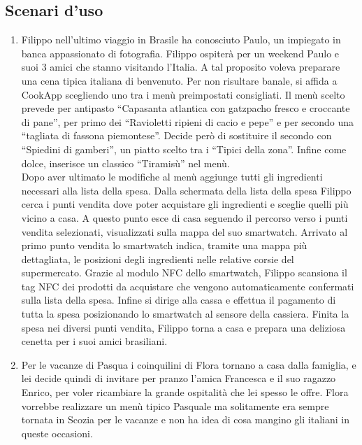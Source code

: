 \subsection{Scenari d'uso}
\begin{enumerate}

\item Filippo nell'ultimo viaggio in Brasile ha conosciuto Paulo, un
impiegato in banca appassionato di fotografia. Filippo ospiterà per un
weekend Paulo
e suoi 3 amici che stanno visitando l'Italia. A tal proposito voleva
preparare una cena tipica italiana di benvenuto. Per non risultare banale,
si affida a
CookApp scegliendo uno tra i menù preimpostati consigliati. Il menù
scelto prevede per antipasto ``Capasanta atlantica con gatzpacho fresco
e croccante di pane'', per primo dei ``Ravioletti ripieni di cacio e
pepe'' e per secondo una ``tagliata di fassona piemontese''. Decide però
di sostituire il secondo con ``Spiedini di gamberi'', un piatto scelto tra i ``Tipici della
zona''. Infine come dolce, inserisce un classico ``Tiramisù'' nel
menù.\\
Dopo aver ultimato le modifiche al menù aggiunge tutti gli ingredienti
necessari alla lista della spesa. Dalla schermata della lista della
spesa Filippo cerca i punti vendita dove poter acquistare gli
ingredienti e sceglie quelli più vicino a casa. A questo punto esce di
casa seguendo il percorso verso i punti vendita selezionati,
visualizzati sulla mappa del suo smartwatch. Arrivato al primo punto
vendita lo smartwatch indica, tramite una mappa più dettagliata, le
posizioni degli ingredienti nelle
relative corsie del supermercato. Grazie al modulo NFC dello smartwatch,
Filippo scansiona il tag NFC dei prodotti da acquistare che vengono
automaticamente confermati sulla lista della spesa. Infine si dirige
alla cassa e effettua il pagamento di tutta la spesa posizionando lo
smartwatch al sensore della cassiera. 
Finita la spesa nei diversi punti vendita, Filippo torna a casa e
prepara una deliziosa cenetta per i suoi amici brasiliani.


\item Per le vacanze di Pasqua i coinquilini di Flora tornano a casa dalla famiglia, e
lei decide quindi di invitare per pranzo l'amica Francesca e il suo
ragazzo Enrico, per voler ricambiare la grande ospitalità che lei spesso
le offre. Flora vorrebbe realizzare un menù tipico Pasquale ma
solitamente era sempre tornata in Scozia per le vacanze e non ha idea di
cosa mangino gli italiani in queste occasioni.


\end{enumerate}
